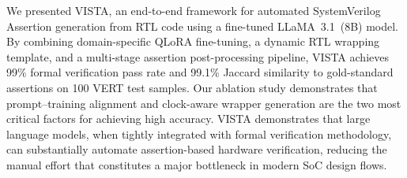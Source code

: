 \documentclass[conference]{IEEEtran}
\begin{document}
We presented VISTA, an end-to-end framework for automated SystemVerilog Assertion generation from RTL code using a fine-tuned LLaMA~3.1~(8B) model. By combining domain-specific QLoRA fine-tuning, a dynamic RTL wrapping template, and a multi-stage assertion post-processing pipeline, VISTA achieves 99\% formal verification pass rate and 99.1\% Jaccard similarity to gold-standard assertions on 100 VERT test samples. Our ablation study demonstrates that prompt--training alignment and clock-aware wrapper generation are the two most critical factors for achieving high accuracy. VISTA demonstrates that large language models, when tightly integrated with formal verification methodology, can substantially automate assertion-based hardware verification, reducing the manual effort that constitutes a major bottleneck in modern SoC design flows.
\end{document}
